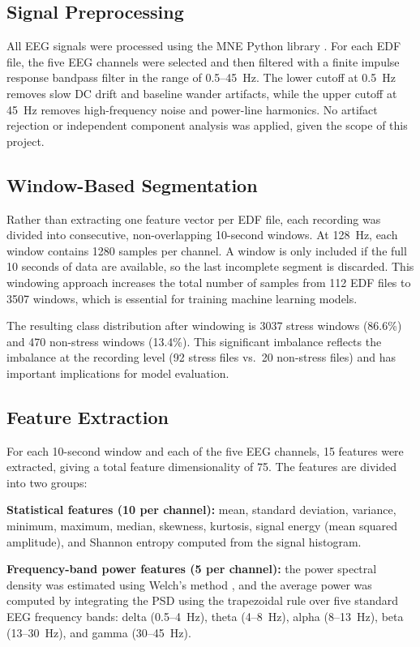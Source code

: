 \documentclass[12pt,a4paper]{article}
\begin{document}
	\subsection{Signal Preprocessing}

	All EEG signals were processed using the MNE Python library \cite{mne}. For each EDF file, the five EEG channels were selected and then filtered with a finite impulse response bandpass filter in the range of 0.5--45~Hz. The lower cutoff at 0.5~Hz removes slow DC drift and baseline wander artifacts, while the upper cutoff at 45~Hz removes high-frequency noise and power-line harmonics. No artifact rejection or independent component analysis was applied, given the scope of this project.

	\subsection{Window-Based Segmentation}

	Rather than extracting one feature vector per EDF file, each recording was divided into consecutive, non-overlapping 10-second windows. At 128~Hz, each window contains 1280 samples per channel. A window is only included if the full 10 seconds of data are available, so the last incomplete segment is discarded. This windowing approach increases the total number of samples from 112 EDF files to 3507 windows, which is essential for training machine learning models.

	The resulting class distribution after windowing is 3037 stress windows (86.6\%) and 470 non-stress windows (13.4\%). This significant imbalance reflects the imbalance at the recording level (92 stress files vs.\ 20 non-stress files) and has important implications for model evaluation.

	\subsection{Feature Extraction}

	For each 10-second window and each of the five EEG channels, 15 features were extracted, giving a total feature dimensionality of 75. The features are divided into two groups:

	\textbf{Statistical features (10 per channel):} mean, standard deviation, variance, minimum, maximum, median, skewness, kurtosis, signal energy (mean squared amplitude), and Shannon entropy computed from the signal histogram.

	\textbf{Frequency-band power features (5 per channel):} the power spectral density was estimated using Welch's method \cite{welch1967}, and the average power was computed by integrating the PSD using the trapezoidal rule over five standard EEG frequency bands: delta (0.5--4~Hz), theta (4--8~Hz), alpha (8--13~Hz), beta (13--30~Hz), and gamma (30--45~Hz).
\end{document}
